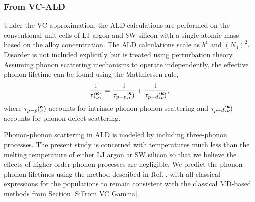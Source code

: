 \documentclass[12pt,twocolumn,iop]{/usr/share/texmf/tex/latex/iop/iopart}[/usr/share/texmf/tex/latex/iop/]
\newcommand{\kv}{\mspace{-4.0mu}\left(\mspace{-8.0mu}
\begin{smallmatrix}&\pmb{\kappa} \\&\nu\end{smallmatrix}
\mspace{-3.0mu}\right)}
\begin{document}
\clearpage

\subsubsection{\label{S:From VC-ALD}From VC-ALD}

Under the VC approximation, the 
ALD calculations\cite{turney_predicting_2009-1} are performed on the 
conventional unit cells of LJ argon and SW silicon with a single  
atomic mass based on the alloy concentration. The ALD calculations scale 
as $b^4$ and $(N_{0})^2$.\cite{turney_predicting_2009} Disorder is not included 
explicitly but is treated using perturbation theory. 
Assuming phonon scattering mechanisms 
to operate independently, the 
effective phonon lifetime can be found using the Matthiessen rule,
\cite{ziman_electrons_2001} 
\begin{equation}\label{EQ:Matthiessen}
\frac{1}{\tau\kv} = \frac{1}{\tau_{p-p}\kv} + \frac{1}{\tau_{p-d}\kv},
\end{equation}
where $\tau_{p-p}\kv$ accounts for intrinsic phonon-phonon scattering 
and $\tau_{p-d}\kv$ accounts for phonon-defect scattering.

Phonon-phonon scattering in ALD is modeled by including three-phonon 
processes.\cite{turney_predicting_2009-1,garg_role_2011,tian_phonon_2012} 
The present study is concerned with temperatures much less than the 
melting temperature of either LJ argon
\cite{mcgaughey_phonon_2004} or 
SW silicon\cite{stillinger_computer_1985} so that we believe the effects 
of higher-order phonon processes are 
negligible.\cite{ecsedy_thermal_1977,turney_predicting_2009-1} 
We predict the phonon-phonon lifetimes using the method 
described in Ref. \cite{turney_predicting_2009-1}, 
with all classical expressions for the populations to remain 
consistent with the classical MD-based methods from 
Section \ref{S:From VC Gamma}. 
\end{document}
